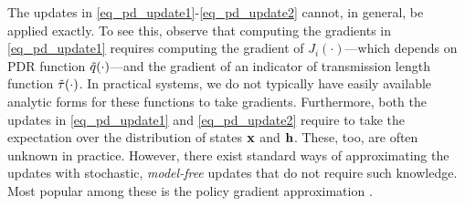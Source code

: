 The updates in \eqref{eq_pd_update1}-\eqref{eq_pd_update2} cannot, in general, be applied exactly. To see this, observe that computing the gradients in \eqref{eq_pd_update1} requires computing the gradient of $J_i(\cdot)$---which depends on PDR function ${\tilde q}(\cdot)$---and the gradient of an indicator of  transmission length function $\tilde\tau(\cdot)$. In practical systems, we do not typically have easily available analytic forms for these functions to take gradients. Furthermore, both the updates in \eqref{eq_pd_update1} and \eqref{eq_pd_update2} require to take the expectation over the distribution of states ${\mathbf x}$ and ${\mathbf h}$. These, too, are often unknown in practice. However, there exist standard ways of approximating the updates with stochastic, \emph{model-free} updates that do not require such knowledge. Most popular among these is the policy gradient approximation \cite{sutton2000policy}. 

